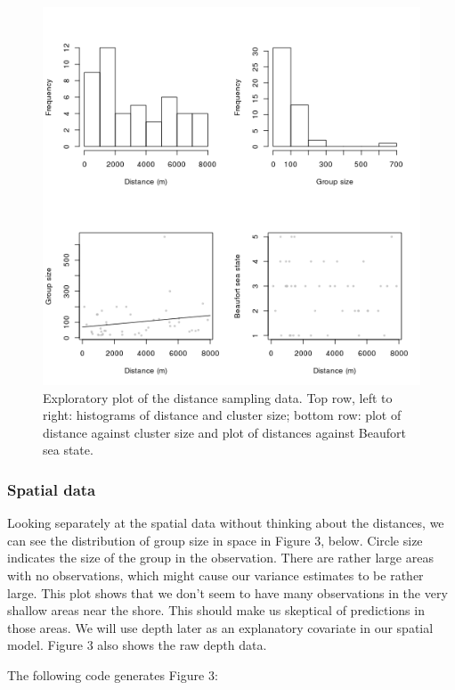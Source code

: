 \documentclass[]{article}
\begin{document}
\begin{figure}[htbp]
\centering
\includegraphics{mexico-figs/EDA-plots.png}
\caption{Exploratory plot of the distance sampling data. Top row, left
to right: histograms of distance and cluster size; bottom row: plot of
distance against cluster size and plot of distances against Beaufort sea
state.}
\end{figure}

\subsubsection{Spatial data}\label{spatial-data}

Looking separately at the spatial data without thinking about the
distances, we can see the distribution of group size in space in Figure
3, below. Circle size indicates the size of the group in the
observation. There are rather large areas with no observations, which
might cause our variance estimates to be rather large. This plot shows
that we don't seem to have many observations in the very shallow areas
near the shore. This should make us skeptical of predictions in those
areas. We will use depth later as an explanatory covariate in our
spatial model. Figure 3 also shows the raw depth data.

The following code generates Figure 3:
\end{document}

